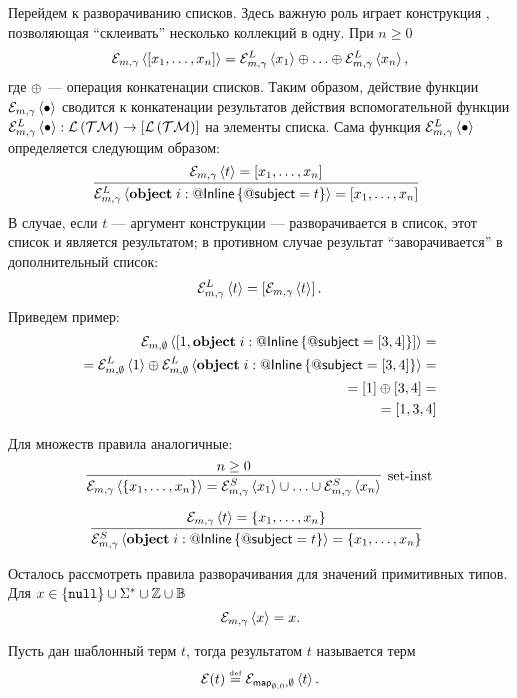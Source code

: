 Перейдем к разворачиванию списков. Здесь важную роль играет конструкция , позволяющая ``склеивать'' несколько коллекций в одну. При $n \ge 0$
$$
\mathcal{E}_{m, \gamma} \left\langle \left[x_1, \ldots, x_n\right] \right\rangle = \mathcal{E}_{m, \gamma}^{L} \left\langle x_1 \right\rangle \oplus \ldots \oplus \mathcal{E}_{m, \gamma}^{L} \left\langle x_n \right\rangle,
$$ 
где $\oplus$ --- операция конкатенации списков. Таким образом, действие функции $\mathcal{E}_{m, \gamma} \left\langle \bullet \right\rangle$ сводится к конкатенации результатов действия вспомогательной функции $\mathcal{E}_{m, \gamma}^{L} \left\langle \bullet \right\rangle : \mathcal{L}\left(\mathcal{TM}\right) \rightarrow \left[\mathcal{L}\left(\mathcal{TM}\right)\right]$ на элементы списка. Сама функция $\mathcal{E}_{m, \gamma}^{L} \left\langle \bullet \right\rangle$ определяется следующим образом:
$$
\trule{
\Inst{\gamma}{t} = \List{x_1, \ldots, x_n}
}{
	\InstL{\gamma}{\Object{i}{\RefSt{Inline}}{\RefSt{subject} = t}} = \List{x_1, \ldots, x_n}
}{}
$$
В случае, если $t$ --- аргумент конструкции  --- разворачивается в список, этот список и является результатом; в противном случае результат ``заворачивается'' в дополнительный список:
$$
	\mathcal{E}_{m, \gamma}^{L} \left\langle t \right\rangle = \left[\mathcal{E}_{m, \gamma} \left\langle t \right\rangle\right].
$$ 
Приведем пример:
\begin{align*}
	\mathcal{E}_{m, \emptyset} \left\langle \left[1, \mathbf{object}\;i : @\mathsf{Inline}\left\{ @\mathsf{subject} = \left[3, 4\right] \right\}\right] \right\rangle = \\
=	\mathcal{E}_{m, \emptyset}^{L} \left\langle 1 \right\rangle \oplus \mathcal{E}_{m, \emptyset}^{L} \left\langle \mathbf{object}\;i : @\mathsf{Inline}\left\{ @\mathsf{subject} = \left[3, 4\right] \right\} \right\rangle = \\
=	\left[1\right] \oplus \left[3, 4\right] = \\
=	\left[1, 3, 4\right]
\end{align*}

Для множеств правила аналогичные:
$$
\trule{
n \ge 0
}{
	\Inst{\gamma}{\Set{x_1, \ldots, x_n}} = \InstS{\gamma}{x_1} \cup \ldots \cup \InstS{\gamma}{x_n}
}{set-inst}
$$ 

$$
\trule{
\Inst{\gamma}{t} = \Set{x_1, \ldots, x_n}
}{
	\InstS{\gamma}{\Object{i}{\RefSt{Inline}}{\RefSt{subject} = t}} = \Set{x_1, \ldots, x_n}
}{}
$$ 

Осталось рассмотреть правила разворачивания для значений примитивных типов. Для $x \in \{\mathtt{null}\} \cup  \Sigma^* \cup \mathbb{Z} \cup \mathbb{B}$
$$
	\mathcal{E}_{m, \gamma} \left\langle x \right\rangle = x.
$$

\begin{Def}
Пусть дан шаблонный терм $t$, тогда результатом  $t$ называется терм $$\mathcal{E}(t) \stackrel{\text{\tiny def}}{=} \mathcal{E}_{\mathsf{map}_{\emptyset, 0}, \emptyset} \left\langle t \right\rangle.$$
\end{Def}


